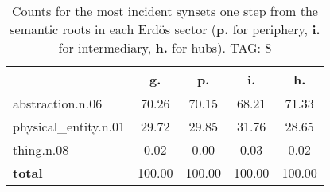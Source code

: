 \begin{table}[h!]
\begin{center}
\begin{tabular}{| l | c | c | c | c |}\hline
 & g. & p. & i. & h. \\\hline
abstraction.n.06 & 70.26  & 70.15  & 68.21  & 71.33 \\\hline
physical\_entity.n.01 & 29.72  & 29.85  & 31.76  & 28.65 \\\hline
thing.n.08 & 0.02  & 0.00  & 0.03  & 0.02 \\\hline
{{\bf total}} & 100.00  & 100.00  & 100.00  & 100.00 \\\hline
\end{tabular}
\caption{Counts for the most incident synsets one step from the semantic roots in each Erd\"os sector ({\bf p.} for periphery, {\bf i.} for intermediary, {\bf h.} for hubs). TAG: 8}
\end{center}
\end{table}